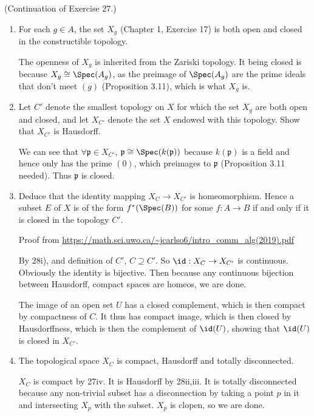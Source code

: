 \begin{questions}
\question (Continuation of Exercise 27.)
\begin{enumerate}
\item For each $g \in A $, the set $X_g $ (Chapter 1, Exercise 17) is both open and closed in the constructible topology.
\begin{solution}
	The openness of $X_g $ is inherited from the Zariski topology.
	It being closed is because $X_g \cong \Spec(A_g) $, as the preimage of $\Spec(A_g) $ are the prime ideals that don't meet $(g) $ (Proposition 3.11), which is what $X_g$ is.
\end{solution}
\item Let $C' $ denote the smallest topology on $X $ for which the set $X_g $ are both open and closed, and let $X_{C'} $ denote the set $X $ endowed with this topology. Show that $X_{C'} $ is Hausdorff.
\begin{solution}
	We can see that $\forall \mathfrak{p} \in X_{C'} $, $\mathfrak{p} \cong \Spec(k(\mathfrak{p})) $ because $k(\mathfrak{p}) $ is a field and hence only has the prime $(0) $, which preimages to $\mathfrak{p} $ (Proposition 3.11 needed).
	Thus $\mathfrak{p} $ is closed.
\end{solution}
\item Deduce that the identity mapping $X_C \to X_{C'} $ is homeomorphism. Hence a subset $E $ of $X $ is of the form $f^\ast(\Spec(B)) $ for some $f: A\to B $ if and only if it is closed in the topology $C' $.
\begin{solution}
	Proof from \url{https://math.sci.uwo.ca/~jcarlso6/intro_comm_alg(2019).pdf}

	By 28i), and definition of $C' $, $C \supseteq C' $.
	So $\id:X_C\to X_{C'} $ is continuous.
	Obviously the identity is bijective.
	Then because any continuous bijection between Hausdorff, compact spaces are homeos, we are done.

	The image of an open set $U $ has a closed complement, which is then compact by compactness of $C $.
	It thus has compact image, which is then closed by Hausdorffness, which is then the complement of $\id(U) $, showing that $\id(U) $ is closed in $X_{C'} $.
\end{solution}
\item The topological space $X_C $ is compact, Hausdorff and totally disconnected.
\begin{solution}
	$X_C $ is compact by 27iv.
	It is Hausdorff by 28ii,iii.
	It is totally disconnected because any non-trivial subset has a disconnection by taking a point $p $ in it and intersecting $X_p $ with the subset.
	$X_p $ is clopen, so we are done.
\end{solution}
\end{enumerate}


\end{questions}
